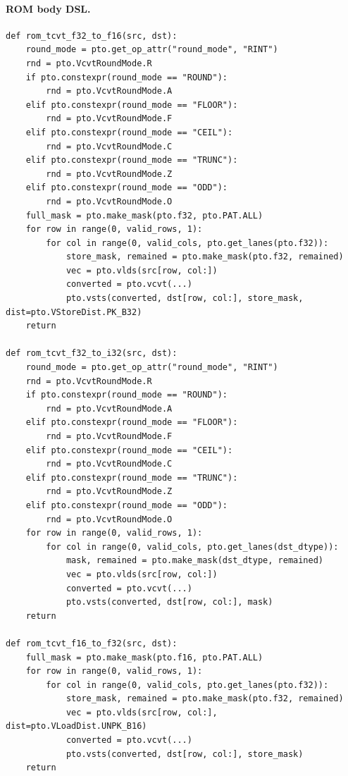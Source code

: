 \paragraph{ROM body DSL.}
\begin{lstlisting}[style=ptocode]
def rom_tcvt_f32_to_f16(src, dst):
    round_mode = pto.get_op_attr("round_mode", "RINT")
    rnd = pto.VcvtRoundMode.R
    if pto.constexpr(round_mode == "ROUND"):
        rnd = pto.VcvtRoundMode.A
    elif pto.constexpr(round_mode == "FLOOR"):
        rnd = pto.VcvtRoundMode.F
    elif pto.constexpr(round_mode == "CEIL"):
        rnd = pto.VcvtRoundMode.C
    elif pto.constexpr(round_mode == "TRUNC"):
        rnd = pto.VcvtRoundMode.Z
    elif pto.constexpr(round_mode == "ODD"):
        rnd = pto.VcvtRoundMode.O
    full_mask = pto.make_mask(pto.f32, pto.PAT.ALL)
    for row in range(0, valid_rows, 1):
        for col in range(0, valid_cols, pto.get_lanes(pto.f32)):
            store_mask, remained = pto.make_mask(pto.f32, remained)
            vec = pto.vlds(src[row, col:])
            converted = pto.vcvt(...)
            pto.vsts(converted, dst[row, col:], store_mask, dist=pto.VStoreDist.PK_B32)
    return

def rom_tcvt_f32_to_i32(src, dst):
    round_mode = pto.get_op_attr("round_mode", "RINT")
    rnd = pto.VcvtRoundMode.R
    if pto.constexpr(round_mode == "ROUND"):
        rnd = pto.VcvtRoundMode.A
    elif pto.constexpr(round_mode == "FLOOR"):
        rnd = pto.VcvtRoundMode.F
    elif pto.constexpr(round_mode == "CEIL"):
        rnd = pto.VcvtRoundMode.C
    elif pto.constexpr(round_mode == "TRUNC"):
        rnd = pto.VcvtRoundMode.Z
    elif pto.constexpr(round_mode == "ODD"):
        rnd = pto.VcvtRoundMode.O
    for row in range(0, valid_rows, 1):
        for col in range(0, valid_cols, pto.get_lanes(dst_dtype)):
            mask, remained = pto.make_mask(dst_dtype, remained)
            vec = pto.vlds(src[row, col:])
            converted = pto.vcvt(...)
            pto.vsts(converted, dst[row, col:], mask)
    return

def rom_tcvt_f16_to_f32(src, dst):
    full_mask = pto.make_mask(pto.f16, pto.PAT.ALL)
    for row in range(0, valid_rows, 1):
        for col in range(0, valid_cols, pto.get_lanes(pto.f32)):
            store_mask, remained = pto.make_mask(pto.f32, remained)
            vec = pto.vlds(src[row, col:], dist=pto.VLoadDist.UNPK_B16)
            converted = pto.vcvt(...)
            pto.vsts(converted, dst[row, col:], store_mask)
    return


\end{lstlisting}
